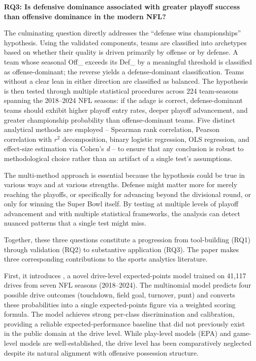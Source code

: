 \textbf{RQ3: Is defensive dominance associated with greater playoff success than offensive dominance in the modern NFL?}

The culminating question directly addresses the ``defense wins championships'' hypothesis. Using the validated \gds{} components, teams are classified into archetypes based on whether their quality is driven primarily by offense or by defense. A team whose seasonal Off\_\xvoa{} exceeds its Def\_\xvoa{} by a meaningful threshold is classified as offense-dominant; the reverse yields a defense-dominant classification. Teams without a clear lean in either direction are classified as balanced. The hypothesis is then tested through multiple statistical procedures across 224 team-seasons spanning the 2018--2024 NFL seasons: if the adage is correct, defense-dominant teams should exhibit higher playoff entry rates, deeper playoff advancement, and greater championship probability than offense-dominant teams. Five distinct analytical methods are employed  -- Spearman rank correlation, Pearson correlation with $r^2$ decomposition, binary logistic regression, OLS regression, and effect-size estimation via Cohen's \emph{d}  -- to ensure that any conclusion is robust to methodological choice rather than an artifact of a single test's assumptions.

The multi-method approach is essential because the hypothesis could be true in various ways and at various strengths. Defense might matter more for merely reaching the playoffs, or specifically for advancing beyond the divisional round, or only for winning the Super Bowl itself. By testing at multiple levels of playoff advancement and with multiple statistical frameworks, the analysis can detect nuanced patterns that a single test might miss.

Together, these three questions constitute a progression from tool-building (RQ1) through validation (RQ2) to substantive application (RQ3). The paper makes three corresponding contributions to the sports analytics literature.

First, it introduces \xscore{}, a novel drive-level expected-points model trained on 41{,}117 drives from seven NFL seasons (2018--2024). The multinomial model predicts four possible drive outcomes (touchdown, field goal, turnover, punt) and converts these probabilities into a single expected-points figure via a weighted scoring formula. The model achieves strong per-class discrimination and calibration, providing a reliable expected-performance baseline that did not previously exist in the public domain at the drive level. While play-level models (EPA) and game-level models \parencite[Elo ratings;][]{silver2014nflelo} are well-established, the drive level has been comparatively neglected despite its natural alignment with offensive possession structure.

